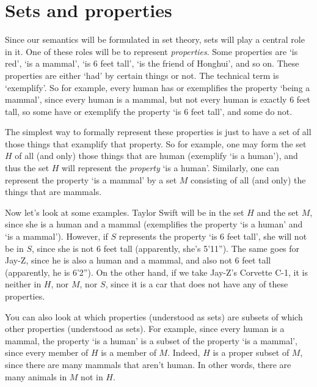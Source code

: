 \section{Sets and properties}

Since our semantics will be formulated in set theory, sets will play a central role in it. One of these roles will be to represent \textit{properties}. Some properties are `is red', `is a mammal', `is 6 feet tall', `is the friend of Honghui', and so on. These properties are either `had' by certain things or not. The technical term is `exemplify'. So for example, every human has or exemplifies the property `being a mammal', since every human is a mammal, but not every human is exactly 6 feet tall, so some have or exemplify the property `is 6 feet tall', and some do not. 

The simplest way to formally represent these properties is just to have a set of all those things that examplify that property. So for example, one may form the set $H$ of all (and only) those things that are human (exemplify `is a human'), and thus the set $H$ will represent the \textit{property} `is a human'. Similarly, one can represent the property `is a mammal' by a set $M$ consisting of all (and only) the things that are mammals. 

Now let's look at some examples. Taylor Swift will be in the set $H$ and the set $M$, since she is a human and a mammal (exemplifies the property `is a human' and `is a mammal'). However, if $S$ represents the property `is 6 feet tall', she will not be in $S$, since she is not 6 feet tall (apparently, she's 5'11''). The same goes for Jay-Z, since he is also a human and a mammal, and also not 6 feet tall (apparently, he is 6'2''). On the other hand, if we take Jay-Z's Corvette C-1, it is neither in $H$, nor $M$, nor $S$, since it is a car that does not have any of these properties. 

You can also look at which properties (understood as sets) are subsets of which other properties (understood as sets). For example, since every human is a mammal, the property `is a human' is a subset of the property `is a mammal', since every member of $H$ is a member of $M$. Indeed, $H$ is a proper subset of $M$, since there are many mammals that aren't human. In other words, there are many animals in $M$ not in $H$. 


